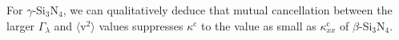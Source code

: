 \documentclass[twocolumn,amsmath,amssymb,a4paper,prb,superscriptaddress,floatfix]{revtex4-1}
\begin{document}
For $\gamma$-Si$_3$N$_4$, we can qualitatively deduce that mutual cancellation
between the larger $\Gamma_\lambda$ and $\langle\text{v}^2\rangle$ values
suppresses $\kappa^\text{c}$ to the value as small as $\kappa^\text{c}_{xx}$ of
$\beta$-Si$_3$N$_4$.
%
%
%
%
%
%
%
\end{document}
